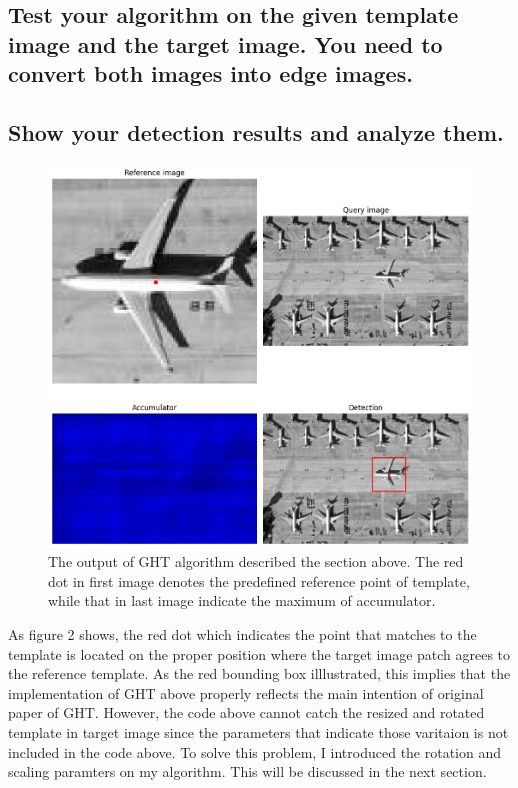 \documentclass[10pt]{article}
\begin{document}
\subsection*{Test your algorithm on the given template image and the target image. You need to convert both images into edge images.}
\subsection*{Show your detection results and analyze them.}
\begin{figure}[!h]
    \begin{center}
        \includegraphics*[scale = 0.4]{../hw2/fig2.png}
    \end{center}
    \caption{The output of GHT algorithm described the section above. The red dot in first image denotes the predefined reference point of template, while that in last image indicate the maximum of accumulator. }
\end{figure}
As figure 2 shows, the red dot which indicates the point that matches to the template is located on the proper position where the target image patch agrees to the reference template. 
As the red bounding box illlustrated, this implies that the implementation of GHT above properly reflects the main intention of original paper of GHT.
However, the code above cannot catch the resized and rotated template in target image since the parameters that indicate those varitaion is not included in the code above.
To solve this problem, I introduced the rotation and scaling paramters on my algorithm. This will be discussed in the next section.  
\end{document}
